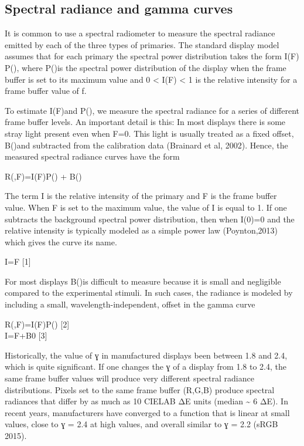 \documentclass[
  letterpaper,
]{book}
\begin{document}
\subsection{Spectral radiance and gamma
curves}\label{spectral-radiance-and-gamma-curves}

It is common to use a spectral radiometer to measure the spectral
radiance emitted by each of the three types of primaries. The standard
display model assumes that for each primary the spectral power
distribution takes the form I(F) P(), where P()is the spectral power
distribution of the display when the frame buffer is set to its maximum
value and 0 \textless{} I(F) \textless{} 1 is the relative intensity for
a frame buffer value of f.

To estimate I(F)and P(), we measure the spectral radiance for a series
of different frame buffer levels. An important detail is this: In most
displays there is some stray light present even when F=0. This light is
usually treated as a fixed offset, B()and subtracted from the
calibration data (Brainard et al, 2002). Hence, the measured spectral
radiance curves have the form

R(,F)=I(F)P() + B()

The term I is the relative intensity of the primary and F is the frame
buffer value. When F is set to the maximum value, the value of I is
equal to 1. If one subtracts the background spectral power distribution,
then when I(0)=0 and the relative intensity is typically modeled as a
simple power law (Poynton,2013) which gives the curve its name.

I=F {[}1{]}

For most displays B()is difficult to measure because it is small and
negligible compared to the experimental stimuli. In such cases, the
radiance is modeled by including a small, wavelength-independent, offset
in the gamma curve

R(,F)=I(F)P() {[}2{]}\\
I=F+B0 {[}3{]}

Historically, the value of ɣ in manufactured displays been between 1.8
and 2.4, which is quite significant. If one changes the ɣ of a display
from 1.8 to 2.4, the same frame buffer values will produce very
different spectral radiance distributions. Pixels set to the same frame
buffer (R,G,B) produce spectral radiances that differ by as much as 10
CIELAB ΔE units (median \textasciitilde{} 6 ΔE). In recent years,
manufacturers have converged to a function that is linear at small
values, close to ɣ = 2.4 at high values, and overall similar to ɣ = 2.2
(sRGB 2015).
\end{document}
